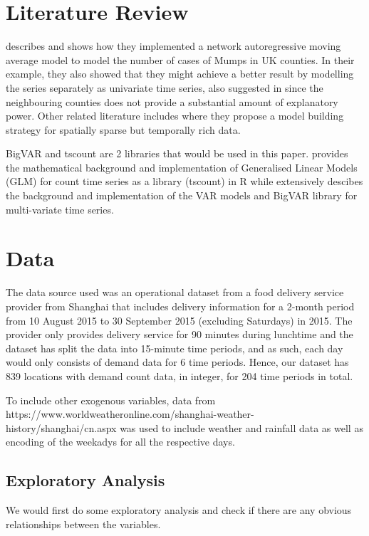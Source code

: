 \documentclass[12pt, letterpaper] {article}
\begin{document}
\section{Literature Review}
\cite{Marina2016} describes and shows how they implemented a network autoregressive moving average model to model the number of cases of Mumps in UK counties. In their example, they also showed that they might achieve a better result by modelling the series separately as univariate time series, also suggested in \cite{Nunes2015} since the neighbouring counties does not provide a substantial amount of explanatory power.  Other related literature includes \cite{Xavier2005} where they propose a model building strategy for spatially sparse but temporally rich data. 

\noindent BigVAR and tscount are 2 libraries that would be used in this paper. \cite{Tobias2017} provides the mathematical background and implementation of Generalised Linear Models (GLM) for count time series as a library (tscount) in R while \cite{William2017} extensively descibes the background and implementation of the VAR models and BigVAR library for multi-variate time series. 

\section{Data}
The data source used was an operational dataset from a food delivery service provider from Shanghai that includes delivery information for a 2-month period from 10 August 2015 to 30 September 2015 (excluding Saturdays) in 2015. The provider only provides delivery service for 90 minutes during lunchtime and the dataset has split the data into 15-minute time periods, and as such, each day would only consists of demand data for 6 time periods. Hence, our dataset has 839 locations with demand count data, in integer, for 204 time periods in total. 

\noindent To include other exogenous variables, data from https://www.worldweatheronline.com/shanghai-weather-history/shanghai/cn.aspx was used to include weather and rainfall data as well as encoding of the weekadys for all the respective days. 

\subsection{Exploratory Analysis}
We would first do some exploratory analysis and check if there are any obvious relationships between the variables. 
\end{document}
